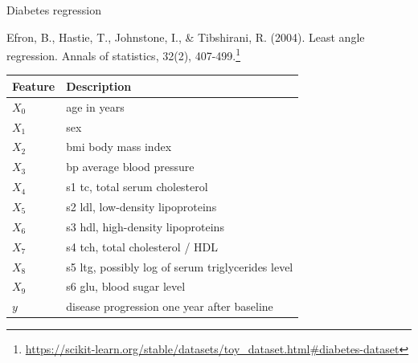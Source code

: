 \documentclass[obeyspaces,aspectratio=43]{beamer}
\renewcommand{\href}[2]{#2\footnote{\url{#1}}}
\begin{document}
\begin{frame}{Diabetes regression}

\href{https://scikit-learn.org/stable/datasets/toy_dataset.html\#diabetes-dataset}{Efron,
B., Hastie, T., Johnstone, I., \& Tibshirani, R. (2004). Least angle
regression. Annals of statistics, 32(2), 407-499.}

\tiny

\begin{longtable}[c]{@{}ll@{}}
\toprule
Feature & Description\tabularnewline
\midrule
\endhead
\(X_0\) & age in years\tabularnewline
\(X_1\) & sex\tabularnewline
\(X_2\) & bmi body mass index\tabularnewline
\(X_3\) & bp average blood pressure\tabularnewline
\(X_4\) & s1 tc, total serum cholesterol\tabularnewline
\(X_5\) & s2 ldl, low-density lipoproteins\tabularnewline
\(X_6\) & s3 hdl, high-density lipoproteins\tabularnewline
\(X_7\) & s4 tch, total cholesterol / HDL\tabularnewline
\(X_8\) & s5 ltg, possibly log of serum triglycerides
level\tabularnewline
\(X_9\) & s6 glu, blood sugar level\tabularnewline
\(y\) & disease progression one year after baseline\tabularnewline
\bottomrule
\end{longtable}

\end{frame}
\end{document}
